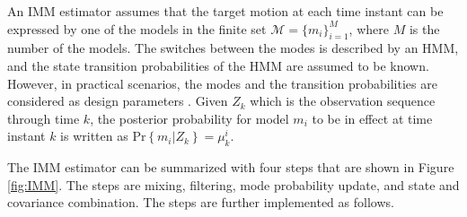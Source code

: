 \documentclass[english, 12pt, a4paper, elec, utf8, a-1b, online]{aaltothesis}
\renewcommand{\Pr}[1]{\text{Pr}\left\{ #1 \right\}}
\begin{document}
An IMM estimator assumes that the target motion at each time instant can be expressed by one of the models in the finite set $\mathcal{M} = \{ m_i \}_{i=1}^M$, where $M$ is the number of the models.
The switches between the modes is described by an HMM, and the state transition probabilities of the HMM are assumed to be known.
However, in practical scenarios, the modes and the transition probabilities are considered as design parameters \cite{Simeonova2002}.
Given $Z_k$ which is the observation sequence through time $k$, the posterior probability for model $m_i$ to be in effect at time instant $k$ is written as $\Pr{m_i | Z_k} = \mu^i_{k}$.


The IMM estimator can be summarized with four steps that are shown in Figure \ref{fig:IMM}.
The steps are mixing, filtering, mode probability update, and state and covariance combination. 
The steps are further implemented as follows. 
\end{document}

